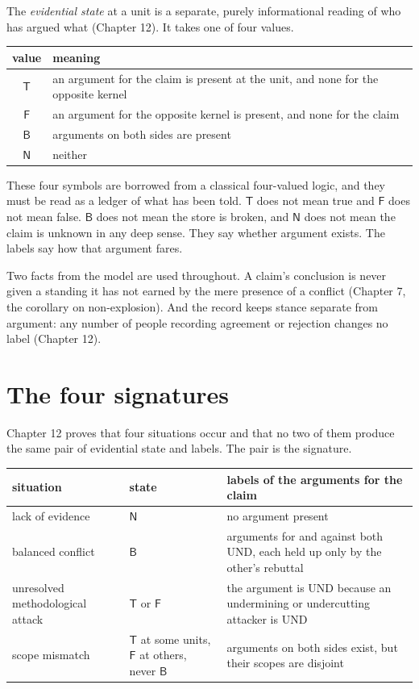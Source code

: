 \documentclass[11pt]{article}
\newcommand{\UND}{\textsf{UND}}
\begin{document}
The \emph{evidential state} at a unit is a separate, purely informational reading of who has argued what (Chapter 12). It takes one of four values.
\begin{center}
\begin{tabular}{@{}cl@{}}
\toprule
value & meaning\\
\midrule
$\mathsf T$ & an argument for the claim is present at the unit, and none for the opposite kernel\\
$\mathsf F$ & an argument for the opposite kernel is present, and none for the claim\\
$\mathsf B$ & arguments on both sides are present\\
$\mathsf N$ & neither\\
\bottomrule
\end{tabular}
\end{center}
These four symbols are borrowed from a classical four-valued logic, and they must be read as a ledger of what has been told. $\mathsf T$ does not mean true and $\mathsf F$ does not mean false. $\mathsf B$ does not mean the store is broken, and $\mathsf N$ does not mean the claim is unknown in any deep sense. They say whether argument exists. The labels say how that argument fares.

Two facts from the model are used throughout. A claim's conclusion is never given a standing it has not earned by the mere presence of a conflict (Chapter 7, the corollary on non-explosion). And the record keeps stance separate from argument: any number of people recording agreement or rejection changes no label (Chapter 12).

\section{The four signatures}\label{sec:signatures}

Chapter 12 proves that four situations occur and that no two of them produce the same pair of evidential state and labels. The pair is the signature.

\begin{center}
\small
\begin{tabularx}{\textwidth}{@{}>{\raggedright\arraybackslash}p{} l X@{}}
\toprule
situation & state & labels of the arguments for the claim\\
\midrule
lack of evidence & $\mathsf N$ & no argument present\\
balanced conflict & $\mathsf B$ & arguments for and against both \UND{}, each held up only by the other's rebuttal\\
unresolved methodological attack & $\mathsf T$ or $\mathsf F$ & the argument is \UND{} because an undermining or undercutting attacker is \UND{}\\
scope mismatch & $\mathsf T$ at some units, $\mathsf F$ at others, never $\mathsf B$ & arguments on both sides exist, but their scopes are disjoint\\
\bottomrule
\end{tabularx}
\end{center}
\end{document}
